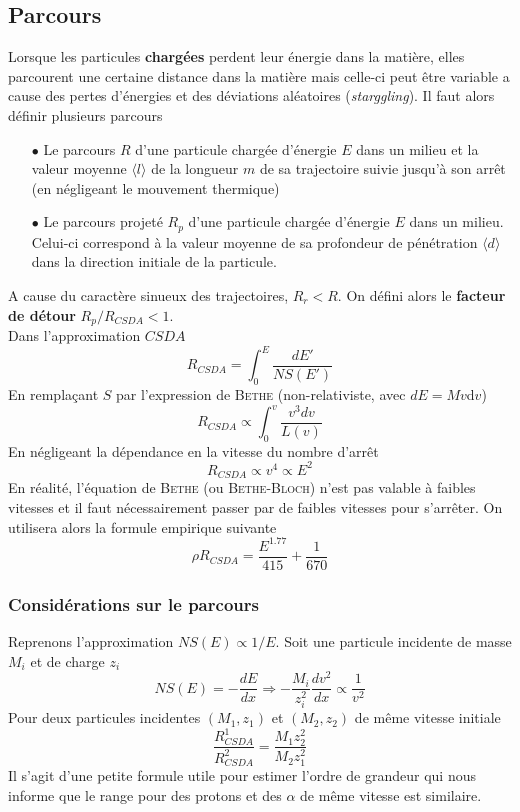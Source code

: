 \subsection{Parcours}
Lorsque les particules \textbf{chargées} perdent leur énergie dans la matière, elles parcourent une
certaine distance dans la matière mais celle-ci peut être variable a cause des pertes d'énergies 
et des déviations aléatoires (\textit{starggling}). Il faut alors définir plusieurs parcours
\begin{itemize}
\item[$\bullet$] Le parcours $R$ d'une particule chargée d'énergie $E$ dans un milieu et 
la valeur moyenne $\langle l \rangle$ de la longueur $m$ de sa trajectoire suivie jusqu'à son 
arrêt (en négligeant le mouvement thermique)
\item[$\bullet$] Le parcours projeté $R_p$ d'une particule chargée d'énergie $E$ dans un milieu. 
Celui-ci correspond à la valeur moyenne de sa profondeur de pénétration $\langle d \rangle$ dans la
direction initiale de la particule.
\end{itemize}
A cause du caractère sinueux des trajectoires, $R_r<R$. On défini alors le \textbf{facteur de détour}
$R_p/R_{CSDA} < 1$.\\

Dans l'approximation $CSDA$
\begin{equation}
R_{CSDA}=\int^{E}_{0}\frac{dE'}{NS(E')}
\end{equation}
En remplaçant $S$ par l'expression de \textsc{Bethe} (non-relativiste, avec $dE=Mv$d$v$)
\begin{equation}
R_{CSDA}\propto \int^{v}_{0}\frac{v^3dv}{L(v)}
\end{equation}
En négligeant la dépendance en la vitesse du nombre d'arrêt 
\begin{equation}
R_{CSDA}\propto v^4\propto E^2
\end{equation}
En réalité, l'équation de \textsc{Bethe} (ou \textsc{Bethe-Bloch}) n'est pas valable à faibles
vitesses et il faut nécessairement passer par de faibles vitesses pour s'arrêter. On utilisera 
alors la formule empirique suivante
\begin{equation}
\rho R_{CSDA}=\frac{E^{1.77}}{415}+\frac{1}{670}
\end{equation}

\subsubsection{Considérations sur le parcours}
Reprenons l'approximation $NS(E)\propto 1/E$. Soit une particule incidente de masse $M_i$ et de
charge $z_i$
\begin{equation}
NS(E)=-\frac{dE}{dx} \Rightarrow -\frac{M_i}{z_i^2}\frac{dv^2}{dx}\propto \frac{1}{v^2}
\end{equation}
Pour deux particules incidentes $(M_1,z_1)$ et $(M_2, z_2)$ de même vitesse initiale
\begin{equation}
\frac{R_{CSDA}^1}{R_{CSDA}^2}=\frac{M_1z_2^2}{M_2z_1^2}
\end{equation}
Il s'agit d'une petite formule utile pour estimer l'ordre de grandeur qui nous informe que le range
pour des protons et des $\alpha$ de même vitesse est similaire.


